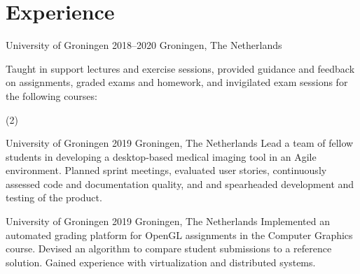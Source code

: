 \section*{Experience}

{University of Groningen} %
{2018--2020} %
{Groningen, The Netherlands} %
{%
	Taught in support lectures and exercise sessions, provided guidance and feedback on assignments, graded exams and homework, and invigilated exam sessions for the following courses:
	\begin{tasks}[style=itemize](2)
	\end{tasks}
}

{University of Groningen} %
{2019} %
{Groningen, The Netherlands} %
{%
	Lead a team of fellow students in developing a desktop-based medical imaging tool in an Agile environment. Planned sprint meetings, evaluated user stories, continuously assessed code and documentation quality, and and spearheaded development and testing of the product.
}

{University of Groningen} %
{2019} %
{Groningen, The Netherlands} %
{
	Implemented an automated grading platform for OpenGL assignments in the Computer Graphics course. Devised an algorithm to compare student submissions to a reference solution. Gained experience with virtualization and distributed systems.
}
